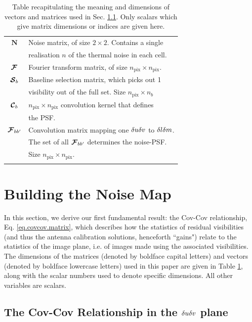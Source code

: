 \begin{table}[t!]
\begin{tabular}{c l}
$\bm{N}$       & Noise matrix, of size $2\times 2$. Contains a single \\
& realisation $n$ of the thermal noise in each cell.\\
$\bm{\mathcal{F}}$       & Fourier transform matrix, of size $n_{\mathrm{pix}}\times n_{\mathrm{pix}}$.\\
$\bm{\mathcal{S}}_b$     & Baseline selection matrix, which picks out 1\\
&  visibility out of the full set. Size $n_{\mathrm{pix}} \times n_b$\\
$\bm{\mathcal{C}}_b$     & $n_{\mathrm{pix}} \times n_{\mathrm{pix}}$ convolution kernel that defines\\
               &  the PSF.\\
$\bm{\mathcal{F}}_{bb'}$ & Convolution matrix mapping one $\delta u\delta v$ to $\delta l\delta m$.\\
& The set of all $\bm{\mathcal{F}}_{bb'}$ determines the noise-PSF.\\
               & Size $n_{\mathrm{pix}} \times n_{\mathrm{pix}}$.\\
&\\
\hline
\end{tabular}
\caption{Table recapitulating the meaning and dimensions of vectors and matrices used {in Sec. \ref{sec.dudv}}. Only scalars which give matrix dimensions or indices are given here.}
\label{tab.variables}
\end{table}

\section{Building the Noise Map}\label{sec.formalism}

\pg
In this section, we derive our first fundamental result: the Cov-Cov relationship, Eq. \ref{eq.covcov.matrix}, which describes how the statistics of residual visibilities (and thus the antenna calibration solutions, henceforth ``gains") relate to the statistics of the image plane, i.e. of images made using the associated visibilities. The dimensions of the matrices (denoted by boldface capital letters) and vectors (denoted by boldface lowercase letters) used in this paper are given in Table \ref{tab.variables}, along with the scalar numbers used to denote specific dimensions. All other variables are scalars.


\subsection{The Cov-Cov Relationship in the $\delta u\delta v$ plane}\label{sec.dudv}

